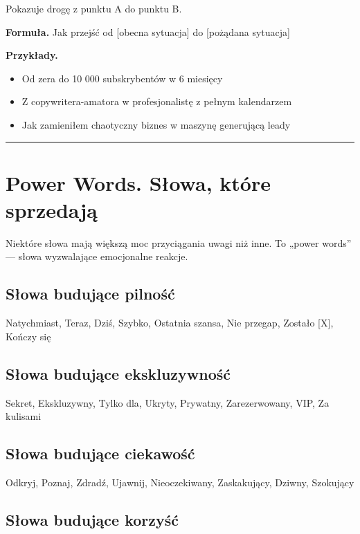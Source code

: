 \documentclass[
  12pt,
  a4paper,
  twoside,
  openright,
  12pt,
  DIV=12,
  BCOR=12mm]{scrbook}
\providecommand{\tightlist}{%
  \setlength{\itemsep}{0pt}\setlength{\parskip}{0pt}}\usepackage{longtable,booktabs,array}
\newcommand{\decoline}{%
  \begin{center}
    \textcolor{bordergray}{\rule{0.3\textwidth}{0.5pt}}
  \end{center}
}
\begin{document}
Pokazuje drogę z punktu A do punktu B.

\textbf{Formuła.} Jak przejść od {[}obecna sytuacja{]} do {[}pożądana
sytuacja{]}

\textbf{Przykłady.}

\begin{itemize}
\tightlist
\item
  Od zera do 10 000 subskrybentów w 6 miesięcy
\item
  Z copywritera-amatora w profesjonalistę z pełnym kalendarzem
\item
  Jak zamieniłem chaotyczny biznes w maszynę generującą leady
\end{itemize}

\decoline

\section{Power Words. Słowa, które
sprzedają}\label{power-words.-sux142owa-ktuxf3re-sprzedajux105}

Niektóre słowa mają większą moc przyciągania uwagi niż inne. To „power
words'' --- słowa wyzwalające emocjonalne reakcje.

\subsection{Słowa budujące
pilność}\label{sux142owa-budujux105ce-pilnoux15bux107}

Natychmiast, Teraz, Dziś, Szybko, Ostatnia szansa, Nie przegap, Zostało
{[}X{]}, Kończy się

\subsection{Słowa budujące
ekskluzywność}\label{sux142owa-budujux105ce-ekskluzywnoux15bux107}

Sekret, Ekskluzywny, Tylko dla, Ukryty, Prywatny, Zarezerwowany, VIP, Za
kulisami

\subsection{Słowa budujące
ciekawość}\label{sux142owa-budujux105ce-ciekawoux15bux107}

Odkryj, Poznaj, Zdradź, Ujawnij, Nieoczekiwany, Zaskakujący, Dziwny,
Szokujący

\subsection{Słowa budujące
korzyść}\label{sux142owa-budujux105ce-korzyux15bux107}
\end{document}
